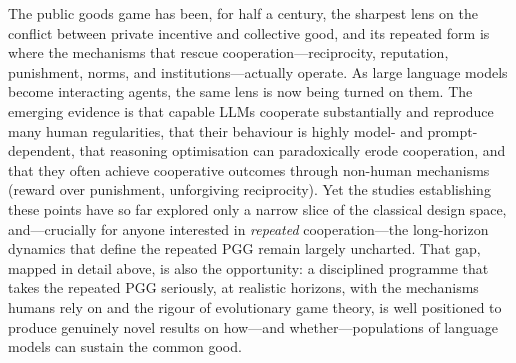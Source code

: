 \documentclass[11pt,a4paper]{article}
\newcommand{\pgg}{public goods game}
\begin{document}
The \pgg{} has been, for half a century, the sharpest lens on the conflict
between private incentive and collective good, and its repeated form is where the
mechanisms that rescue cooperation---reciprocity, reputation, punishment, norms,
and institutions---actually operate. As large language models become interacting
agents, the same lens is now being turned on them. The emerging evidence is that
capable LLMs cooperate substantially and reproduce many human regularities, that
their behaviour is highly model- and prompt-dependent, that reasoning optimisation
can paradoxically erode cooperation, and that they often achieve cooperative
outcomes through non-human mechanisms (reward over punishment, unforgiving
reciprocity). Yet the studies establishing these points have so far explored only
a narrow slice of the classical design space, and---crucially for anyone interested
in \emph{repeated} cooperation---the long-horizon dynamics that define the
repeated PGG remain largely uncharted. That gap, mapped in detail above, is also
the opportunity: a disciplined programme that takes the repeated PGG seriously, at
realistic horizons, with the mechanisms humans rely on and the rigour of
evolutionary game theory, is well positioned to produce genuinely novel results on
how---and whether---populations of language models can sustain the common good.


\end{document}

